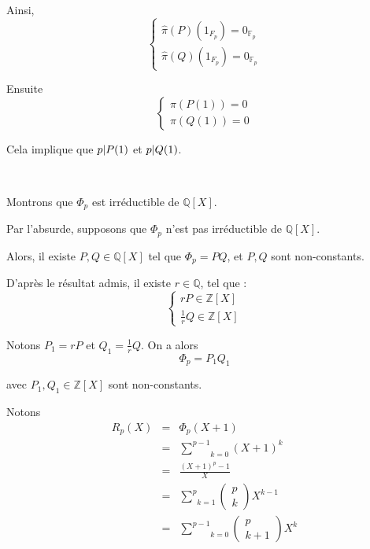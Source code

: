 Ainsi,
\[ \left\{\begin{array}{l}
     \hat{\pi} (P) (1_{F_p}) = 0_{\mathbb{F}_p}\\
     \hat{\pi} (Q) (1_{F_p}) = 0_{\mathbb{F}_p}
   \end{array}\right. \]


Ensuite
\[ \left\{\begin{array}{l}
     \pi (P (1)) = 0\\
     \pi (Q (1)) = 0
   \end{array}\right. \]


Cela implique que $p | P (1) $ et $p | Q (1) $.

\

 Montrons que $\Phi_p$ est irr{\'e}ductible de $\mathbb{Q}
[X] .$

Par l'absurde, supposons que $\Phi_p$ n'est pas irr{\'e}ductible de
$\mathbb{Q} [X]$.

Alors, il existe $P, Q \in \mathbb{Q} [X]$ tel que $\Phi_p = P Q$, et $P, Q$
sont non-constants.

D'apr{\`e}s le r{\'e}sultat admis, il existe $r \in \mathbb{Q}$, tel que :
\[ \left\{\begin{array}{l}
     r P \in \mathbb{Z} [X]\\
     \frac{1}{r} Q \in \mathbb{Z} [X]
   \end{array}\right. \]


Notons $P_1 = r P$ et $Q_1 = \frac{1}{r} Q$. On a alors
\[ \Phi_p = P_1 Q_1 \]


avec $P_1, Q_1 \in \mathbb{Z} [X]$ sont non-constants.

Notons
\begin{eqnarray*}
  R_p (X) & = & \Phi_p (X + 1)\\
  & = & \underset{k = 0}{\overset{p - 1}{\sum}} (X + 1)^k\\
  & = & \frac{(X + 1)^p - 1}{X}\\
  & = & \underset{k = 1}{\overset{p}{\sum}} \left( \begin{array}{c}
    p\\
    k
  \end{array} \right) X^{k - 1}\\
  & = & \underset{k = 0}{\overset{p - 1}{\sum}} \left( \begin{array}{c}
    p\\
    k + 1
  \end{array} \right) X^k
\end{eqnarray*}


